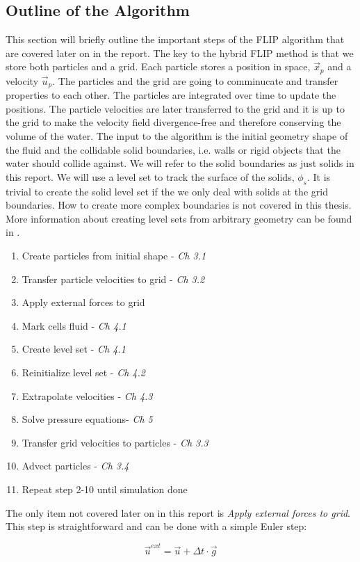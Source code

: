 \subsection{Outline of the Algorithm}

This section will briefly outline the important steps of the FLIP algorithm that are covered later on in the report. The key to the hybrid FLIP method is that we store both particles and a grid. Each particle stores a position in space, $\vec{x}_p$ and a velocity $\vec{u}_p$. The particles and the grid are going to comminucate and transfer properties to each other. The particles are integrated over time to update the positions. The particle velocities are later transferred to the grid and it is up to the grid to make the velocity field divergence-free and therefore conserving the volume of the water. The input to the algorithm is the initial geometry shape of the fluid and the collidable solid boundaries, i.e. walls or rigid objects that the water should collide against. We will refer to the solid boundaries as just solids in this report. We will use a level set to track the surface of the solids, $\phi_s$. It is trivial to create the solid level set if the we only deal with solids at the grid boundaries. How to create more complex boundaries is not covered in this thesis. More information about creating level sets from arbitrary geometry can be found in \cite{meshtosdf}.

\begin{enumerate}
\item Create particles from initial shape - \emph{Ch 3.1}
\item Transfer particle velocities to grid - \emph{Ch 3.2}
\item Apply external forces to grid
\item Mark cells fluid - \emph{Ch 4.1}
\item Create level set - \emph{Ch 4.1}
\item Reinitialize level set - \emph{Ch 4.2}
\item Extrapolate velocities - \emph{Ch 4.3}
\item Solve pressure equations- \emph{Ch 5}
\item Transfer grid velocities to particles - \emph{Ch 3.3}
\item Advect particles - \emph{Ch 3.4}
\item Repeat step 2-10 until simulation done
\end{enumerate}

The only item not covered later on in this report is \emph{Apply external forces to grid}. This step is straightforward and can be done with a simple Euler step:

\begin{equation}
\vec{u}^{ext} = \vec{u} + \Delta t \cdot \vec{g}
\end{equation}
